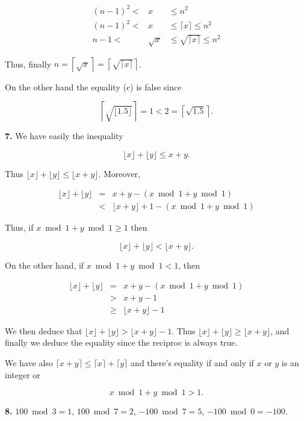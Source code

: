 \documentclass[a4paper,12pt]{article}
\newcommand{\newpar}[1]{\bigskip \noindent \textbf{#1.}}
\begin{document}
\begin{eqnarray*}
  (n-1)^2 < &x& \le n^2 \\
  (n-1)^2 < &x& \le \lceil x\rceil \le n^2 \\
  n-1 < &\sqrt{x}& \le \sqrt{\lceil x\rceil}\le n^2
\end{eqnarray*}

Thus, finally $n = \left\lceil \sqrt{x}\right\rceil = \left\lceil
\sqrt{\lceil x\rceil}\right\rceil$.

On the other hand the equality (c) is false since

\[ \left\lceil \sqrt{\lfloor 1.5 \rfloor}\right\rceil = 1 < 2 =
\left\lceil \sqrt{1.5}\right\rceil.\]

\newpar{7}  We have easily the inequality

\[ \lfloor x \rfloor + \lfloor y\rfloor \le x + y.\]

Thus $\lfloor x\rfloor + \lfloor y\rfloor \le \lfloor x + y\rfloor$.
Moreover,

\begin{eqnarray*}
  \lfloor x\rfloor + \lfloor y \rfloor &=& x + y - (x \bmod 1 + y
  \bmod 1) \\
  &<& \lfloor x + y\rfloor + 1 - (x \bmod 1 + y \bmod 1)
\end{eqnarray*}

Thus, if $x \bmod 1 + y \bmod 1 \ge 1$ then

\[ \lfloor x\rfloor + \lfloor y\rfloor < \lfloor x + y\rfloor.\]

On the other hand, if $x \bmod 1 + y \bmod 1 < 1$, then

\begin{eqnarray*}
  \lfloor x\rfloor + \lfloor y\rfloor &=& x + y - (x\bmod1 +
  y\bmod1)\\
  &>& x + y - 1 \\
  &\ge& \lfloor x + y \rfloor -1
\end{eqnarray*}

We then deduce that $\lfloor x\rfloor + \lfloor y\rfloor > \lfloor x +
y\rfloor - 1$.  Thus $\lfloor x\rfloor + \lfloor y\rfloor \ge \lfloor
x + y\rfloor$, and finally we deduce the equality since the
reciproc is always true.

We have also $\lceil x + y\rceil \le \lceil x\rceil + \lceil y \rceil$
and there's equality if and only if $x$ or $y$ is an integer or

\[ x \bmod 1 + y \bmod 1 > 1.\]

\newpar{8} $100 \bmod 3 = 1$, $100 \bmod 7 = 2$, $-100 \bmod 7 = 5$,
$-100 \bmod 0 = -100$.
\end{document}
